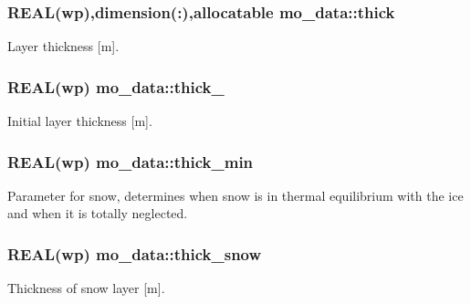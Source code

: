 \hypertarget{namespacemo__data_a1409d49184dc3835ab1186dde372d381}{
\subsubsection[{thick}]{\setlength{\rightskip}{0pt plus 5cm}REAL(wp),dimension(:),allocatable {\bf mo\_\-data::thick}}}
\label{namespacemo__data_a1409d49184dc3835ab1186dde372d381}


Layer thickness \mbox{[}m\mbox{]}. 

\hypertarget{namespacemo__data_ad96d7ce134bb7b86325830161046d367}{
\subsubsection[{thick\_\-0}]{\setlength{\rightskip}{0pt plus 5cm}REAL(wp) {\bf mo\_\-data::thick\_}}}
\label{namespacemo__data_ad96d7ce134bb7b86325830161046d367}


Initial layer thickness \mbox{[}m\mbox{]}. 

\hypertarget{namespacemo__data_a866fe962819eea1c688afb5b07109bdd}{
\subsubsection[{thick\_\-min}]{\setlength{\rightskip}{0pt plus 5cm}REAL(wp) {\bf mo\_\-data::thick\_\-min}}}
\label{namespacemo__data_a866fe962819eea1c688afb5b07109bdd}


Parameter for snow, determines when snow is in thermal equilibrium with the ice and when it is totally neglected. 

\hypertarget{namespacemo__data_a21342bcdb92f398a57a8eef77c77191a}{
\subsubsection[{thick\_\-snow}]{\setlength{\rightskip}{0pt plus 5cm}REAL(wp) {\bf mo\_\-data::thick\_\-snow}}}
\label{namespacemo__data_a21342bcdb92f398a57a8eef77c77191a}


Thickness of snow layer \mbox{[}m\mbox{]}. 


